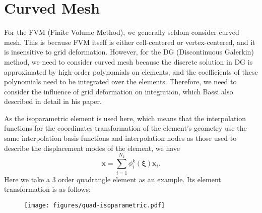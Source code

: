 \documentclass{develop-note}
\begin{document}
\section{Curved Mesh}

For the FVM (Finite Volume Method), we generally seldom consider curved mesh. This is because FVM itself is either cell-centered or vertex-centered, and it is insensitive to grid deformation. However, for the DG (Discontinuous Galerkin) method, we need to consider curved mesh because the discrete solution in DG is approximated by high-order polynomials on elements, and the coefficients of these polynomials need to be integrated over the elements. Therefore, we need to consider the influence of grid deformation on integration, which Bassi also described in detail in his paper\cite{bassiHighOrderAccurateDiscontinuous1997}.

As the isoparametric element is used here, which means that the interpolation functions for the coordinates transformation of the element's geometry use the same interpolation basis functions and interpolation nodes as those used to describe the displacement modes of the element, we have
\begin{equation}
  \mathbf{x}=\sum_{i=1}^{N_{k}}\phi_{i}^{k}(\bm{\xi})\mathbf{x}_{i}.
\end{equation}
Here we take a 3 order quadrangle element as an example. Its element transformation is as follows:

\begin{figure}[H]
  \centering
  \texttt{[image: figures/quad-isoparametric.pdf]}
\end{figure}
\end{document}
